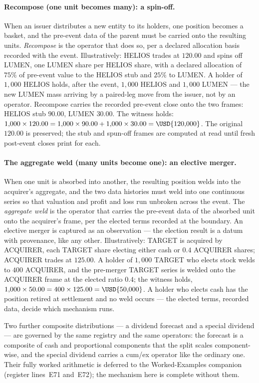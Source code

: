 \paragraph{Recompose (one unit becomes many): a spin-off.}
When an issuer distributes a new entity to its holders, one position becomes a basket, and
the pre-event data of the parent must be carried onto the resulting units. \emph{Recompose}
is the operator that does so, per a declared allocation basis recorded with the event.
Illustratively: HELIOS trades at $120.00$ and spins off LUMEN, one LUMEN share per HELIOS
share, with a declared allocation of $75\%$ of pre-event value to the HELIOS stub and
$25\%$ to LUMEN. A holder of $1{,}000$ HELIOS holds, after the event, $1{,}000$ HELIOS and
$1{,}000$ LUMEN --- the new LUMEN mass arriving by a paired-leg move from the issuer, not by
an operator. Recompose carries the recorded pre-event close onto the two frames: HELIOS stub
$90.00$, LUMEN $30.00$. The witness holds: $1{,}000 \times 120.00 = 1{,}000 \times 90.00 +
1{,}000 \times 30.00 = \USD{120{,}000}$. The original $120.00$ is preserved; the stub and
spun-off frames are computed at read until fresh post-event closes print for each.

\paragraph{The aggregate weld (many units become one): an elective merger.}
When one unit is absorbed into another, the resulting position welds into the acquirer's
aggregate, and the two data histories must weld into one continuous series so that valuation
and profit and loss run unbroken across the event. The \emph{aggregate weld} is the operator
that carries the pre-event data of the absorbed unit onto the acquirer's frame, per the
elected terms recorded at the boundary. An elective merger is captured as an observation ---
the election result is a datum with provenance, like any other. Illustratively: TARGET is
acquired by ACQUIRER, each TARGET share electing either  cash or $0.4$ ACQUIRER
shares; ACQUIRER trades at $125.00$. A holder of $1{,}000$ TARGET who elects stock welds to
$400$ ACQUIRER, and the pre-merger TARGET series is welded onto the ACQUIRER frame at the
elected ratio $0.4$; the witness holds, $1{,}000 \times 50.00 = 400 \times 125.00 =
\USD{50{,}000}$. A holder who elects cash has the position retired at settlement and no weld
occurs --- the elected terms, recorded data, decide which mechanism runs.

Two further composite distributions --- a dividend forecast and a special dividend --- are
governed by the same registry and the same operators: the forecast is a composite of cash
and proportional components that the split scales component-wise, and the special dividend
carries a cum/ex operator like the ordinary one. Their fully worked arithmetic is deferred
to the Worked-Examples companion (register lines~E71 and~E72); the mechanism here is
complete without them.

